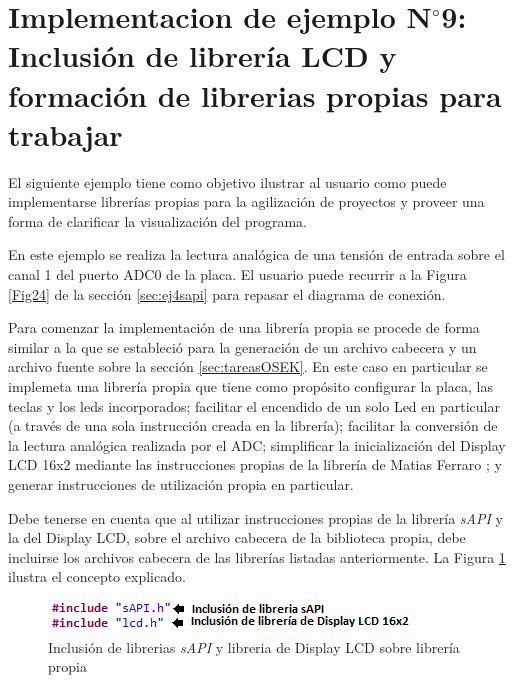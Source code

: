 \documentclass[12pt,letterpaper]{article}
\begin{document}
\section{Implementacion de ejemplo N$^{\circ}$9: Inclusión de librería LCD y formación de librerias propias para trabajar}
El siguiente ejemplo tiene como objetivo ilustrar al usuario como puede implementarse librerías propias para la agilización de proyectos y proveer una forma de clarificar la visualización del programa.

En este ejemplo se realiza la lectura analógica de una tensión de entrada sobre el canal 1 del puerto ADC0 de la placa. El usuario puede recurrir a la Figura \ref{Fig24} de la sección \ref{sec:ej4sapi} para repasar el diagrama de conexión.

Para comenzar la implementación de una librería propia se procede de forma similar a la que se estableció para la generación de un archivo cabecera y un archivo fuente sobre la sección \ref{sec:tareasOSEK}. En este caso en particular se implemeta una librería propia que tiene como propósito configurar la placa, las teclas y los leds incorporados; facilitar el encendido de un solo Led en particular (a través de una sola instrucción creada en la librería); facilitar la conversión de la lectura analógica realizada por el ADC; simplificar la inicialización del Display LCD 16x2 mediante las instrucciones propias de la librería de Matias Ferraro \cite{repositoriomatiasferraro}; y generar instrucciones de utilización propia en particular.

Debe tenerse en cuenta que al utilizar instrucciones propias de la librería \textit{sAPI} y la del Display LCD, sobre el archivo cabecera de la biblioteca propia, debe incluirse los archivos cabecera de las librerías listadas anteriormente. La Figura \ref{Fig47} ilustra el concepto explicado.

\begin{center}
\begin{figure}[!h]
\centering
\includegraphics[width=8 cm]{figuras/f40.png}
\caption{Inclusión de librerias \textit{sAPI} y libreria de Display LCD sobre librería propia}
\label{Fig47}
\end{figure}
\end{center}
\end{document}

